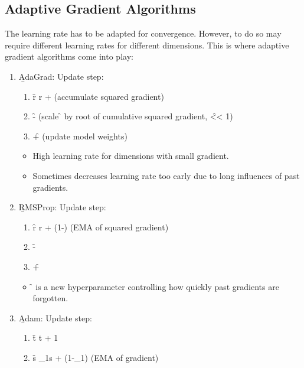 \subsection{Adaptive Gradient Algorithms}
The learning rate has to be adapted for convergence. However, to do so may require different learning rates for different dimensions. This is where adaptive gradient algorithms come into play:
\begin{enumerate}
    \item \b{AdaGrad:} Update step:
    \begin{enumerate}
        \item \f{r \leftarrow r +  \odot {}\quad} (accumulate squared gradient)
        \item \f{\Delta\theta \leftarrow -  \odot {}\quad} (scale \f{\alpha} by root of cumulative squared gradient, \f{\epsilon << 1})
        \item \f{\theta \leftarrow \theta + \Delta\theta\quad} (update model weights)
    \end{enumerate}
    \begin{itemize}
        \item High learning rate for dimensions with small gradient.
        \item Sometimes decreases learning rate too early due to long influences of past gradients.
    \end{itemize}
    \item \b{RMSProp:} Update step:
    \begin{enumerate}
        \item \f{r \leftarrow \rho r + (1-\rho) \odot {}\quad} (EMA of squared gradient)
        \item \f{\Delta\theta \leftarrow -  \odot {}\quad}
        \item \f{\theta \leftarrow \theta + \Delta\theta\quad}
    \end{enumerate}
    \begin{itemize}
        \item \f{\rho} is a new hyperparameter controlling how quickly past gradients are forgotten.
    \end{itemize}
    \item \b{Adam:} Update step:
    \begin{enumerate}
        \item \f{t \leftarrow t + 1}
        \item \f{s \leftarrow \rho_1s + (1-\rho_1)\quad} (EMA of gradient)

\end{enumerate}
\end{enumerate}
